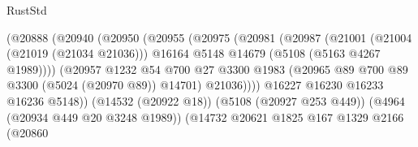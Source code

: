 \begin{lexlean}{RustStd}
\begin{coremodule}
                                          (@20888
                                            (@20940
                                              (@20950
                                                (@20955
                                                  (@20975
                                                    (@20981
                                                      (@20987
                                                        (@21001
                                                          (@21004 (@21019 (@21034 @21036)))
                                                          @16164
                                                          @5148
                                                          @14679
                                                          (@5108 (@5163 @4267 @1989))))
                                                      (@20957
                                                        @1232
                                                        @54
                                                        @700
                                                        @27
                                                        @3300
                                                        @1983
                                                        (@20965
                                                          @89
                                                          @700
                                                          @89
                                                          @3300
                                                          (@5024 (@20970 @89))
                                                          @14701)
                                                        @21036))))
                                                @16227
                                                @16230
                                                @16233
                                                @16236
                                                @5148))
                                            (@14532 (@20922 @18))
                                            (@5108 (@20927 @253 @449))
                                            (@4964 (@20934 @449 @20 @3248 @1989))
                                            (@14732
                                              @20621
                                              @1825
                                              @167
                                              @1329
                                              @2166
                                              (@20860

\end{coremodule}
\end{lexlean}
